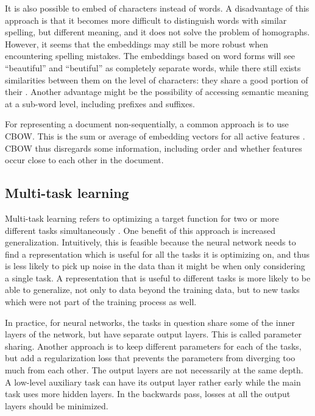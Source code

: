 It is also possible to embed \ngrams of characters instead of words. A
disadvantage of this approach is that it becomes more difficult to
distinguish words with similar spelling, but different meaning, and it does
not solve the problem of homographs. However, it seems that the embeddings
may still be more robust when encountering spelling mistakes. The embeddings
based on word forms will see ``beautiful'' and ``beutiful'' as completely
separate words, while there still exists similarities between them on the
level of characters: they share a good portion of their \ngrams. Another
advantage might be the possibility of accessing semantic meaning at a
sub-word level, including prefixes and suffixes.

For representing a document non-sequentially, a common approach is to use
\ac{CBOW}. This is the sum or average of embedding vectors for all active
features \autocite[352]{goldberg2016primer}. \ac{CBOW} thus disregards some
information, including order and whether features occur close to each other
in the document.


\subsection{Multi-task learning}

Multi-task learning refers to optimizing a target function for two or more
different tasks simultaneously \autocite{ruder17overview}. One benefit of
this approach is increased generalization. Intuitively, this is feasible
because the neural network needs to find a representation which is useful for
all the tasks it is optimizing on, and thus is less likely to pick up noise
in the data than it might be when only considering a single task. A
representation that is useful to different tasks is more likely to be able to
generalize, not only to data beyond the training data, but to new tasks which
were not part of the training process as well.

In practice, for neural networks, the tasks in question share some of the
inner layers of the network, but have separate output layers. This is called
parameter sharing. Another approach is to keep different parameters for each
of the tasks, but add a regularization loss that prevents the parameters from
diverging too much from each other. The output layers are not necessarily at
the same depth. A low-level auxiliary task can have its output layer rather
early while the main task uses more hidden layers. In the backwards pass,
losses at all the output layers should be minimized.

